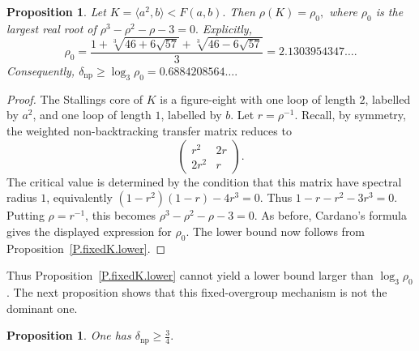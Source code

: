 \documentclass{amsproc}
\newtheorem{proposition}[theorem]{Proposition}
\begin{document}
\begin{proposition}\label{P.a2b.lower}
Let
$
        K=\langle a^2,b\rangle<F(a,b).
$
Then
$
        \rho(K)=\rho_0,
$
where $\rho_0$ is the largest real root of
$
        \rho^3-\rho^2-\rho-3=0.
$
Explicitly,
\[
        \rho_0=
        \frac{1+\sqrt[3]{46+6\sqrt{57}}+\sqrt[3]{46-6\sqrt{57}}}{3}
        =2.1303954347\ldots .
\]
Consequently,
$
        \delta_{\mathrm{np}}
        \geq \log_3\rho_0=0.6884208564\ldots .
$
\end{proposition}

\begin{proof}
The Stallings core of $K$ is a figure-eight with one loop of length $2$,
labelled by $a^2$, and one loop of length $1$, labelled by $b$.  Let
$r=\rho^{-1}$.  Recall, by symmetry, the weighted non-backtracking transfer matrix
reduces to
\[
        \begin{pmatrix}
                r^2 & 2r \\
                2r^2 & r
        \end{pmatrix}.
\]
The critical value is determined by the condition that this matrix have
spectral radius $1$, equivalently
$
        (1-r^2)(1-r)-4r^3=0.
$
Thus
$
        1-r-r^2-3r^3=0.
$
Putting $\rho=r^{-1}$, this becomes
$
        \rho^3-\rho^2-\rho-3=0.
$
As before, Cardano's formula gives the displayed expression for $\rho_0$.  The lower bound
now follows from Proposition~\ref{P.fixedK.lower}.
\end{proof}

Thus Proposition~\ref{P.fixedK.lower} cannot yield a lower bound larger than
$\log_3\rho_0$.  The next proposition shows that this fixed-overgroup mechanism
is not the dominant one.

\begin{proposition}\label{P.variable.lower}
One has
$
        \delta_{\mathrm{np}}\geq \frac34.
$
\end{proposition}
\end{document}
